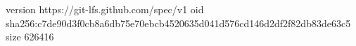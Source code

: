 version https://git-lfs.github.com/spec/v1
oid sha256:c7de90d3f0cb8a6db75e70ebcb4520635d041d576cd146d2df2f82db83de63c5
size 626416
